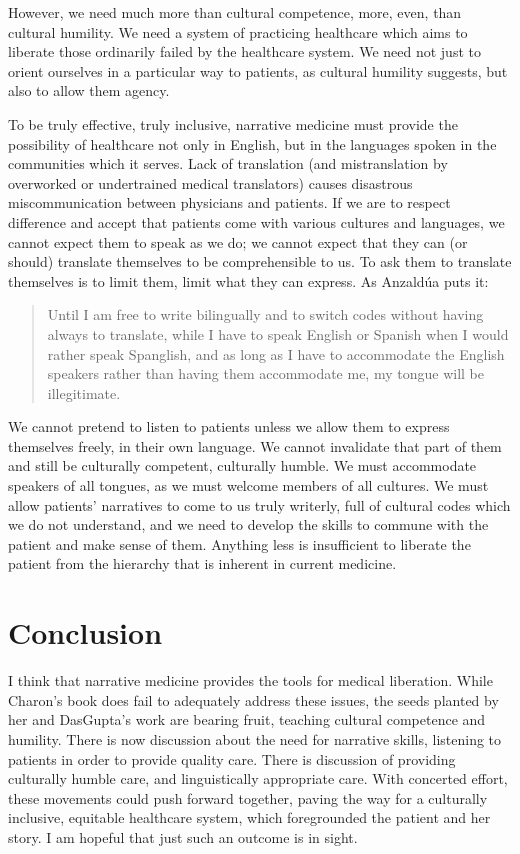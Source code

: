 \documentclass[12pt]{article}
\begin{document}
However, we need much more than cultural competence, more, even, than cultural
humility.  We need a system of practicing healthcare which aims to liberate
those ordinarily failed by the healthcare system.  We need not just to orient
ourselves in a particular way to patients, as cultural humility suggests, but
also to allow them agency.




To be truly effective, truly inclusive, narrative medicine must provide the
possibility of healthcare not only in English, but in the languages spoken in
the communities which it serves. Lack of translation (and mistranslation by
overworked or undertrained medical translators) causes disastrous
miscommunication between physicians and
patients.\autocite{Flores06} If we are to respect difference and accept that
patients come with various cultures and languages, we cannot expect them to 
speak as we do; we cannot expect that they can (or should) translate themselves
to be comprehensible to us. To ask them to translate themselves is to limit
them, limit what they can express. As Anzald\'{u}a puts it:
\begin{quote}
	Until I am free to write bilingually and to switch codes without having
	always to translate, while I have to speak English or Spanish when I would
	rather speak Spanglish, and as long as I have to accommodate the English
	speakers rather than having them accommodate me, my tongue will be
	illegitimate.\autocite[p.~59]{Anzaldua87}
\end{quote}
We cannot pretend to listen to patients unless we allow them to express 
themselves freely, in their own language. We cannot invalidate that part of
them and still be culturally competent, culturally humble. We must accommodate
speakers of all tongues, as we must welcome members of all cultures.
We must allow patients' narratives to come to us truly writerly, full of
cultural codes which we do not understand, and we need to develop the skills
to commune with the patient and make sense of them. Anything less is 
insufficient to liberate the patient from the hierarchy that is inherent in
current medicine.

\section{Conclusion}

I think that narrative medicine provides the tools for medical liberation.
While Charon's book does fail to adequately address these issues, the seeds
planted by her and DasGupta's work are bearing fruit, teaching cultural
competence and humility. There is now discussion about the need for narrative
skills, listening to patients in order to provide quality care. There is 
discussion of providing culturally humble care, and linguistically appropriate
care.\autocite{Koh14} With concerted effort, these movements could push forward
together, paving the way for a culturally inclusive, equitable healthcare
system, which foregrounded the patient and her story. I am hopeful that just
such an outcome is in sight.
\end{document}
